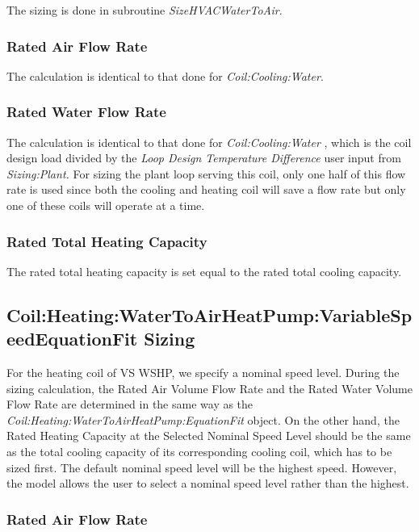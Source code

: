 The sizing is done in subroutine \emph{SizeHVACWaterToAir.}

\subsubsection{Rated Air Flow Rate}\label{rated-air-flow-rate-2}

The calculation is identical to that done for \emph{Coil:Cooling:Water}.

\subsubsection{Rated Water Flow Rate}\label{rated-water-flow-rate-2}

The calculation is identical to that done for \emph{Coil:Cooling:Water} , which is the coil design load divided by the \emph{Loop Design Temperature Difference} user input from \emph{Sizing:Plant.} For sizing the plant loop serving this coil, only one half of this flow rate is used since both the cooling and heating coil will save a flow rate but only one of these coils will operate at a time.

\subsubsection{Rated Total Heating Capacity}\label{rated-total-heating-capacity}

The rated total heating capacity is set equal to the rated total cooling capacity.

\subsection{Coil:Heating:WaterToAirHeatPump:VariableSpeedEquationFit Sizing}\label{coilheatingwatertoairheatpumpvariablespeedequationfit-sizing}

For the heating coil of VS WSHP, we specify a nominal speed level. During the sizing calculation, the Rated Air Volume Flow Rate and the Rated Water Volume Flow Rate are determined in the same way as the \emph{Coil:Heating:WaterToAirHeatPump:EquationFit} object. On the other hand, the Rated Heating Capacity at the Selected Nominal Speed Level should be the same as the total cooling capacity of its corresponding cooling coil, which has to be sized first. The default nominal speed level will be the highest speed. However, the model allows the user to select a nominal speed level rather than the highest.

\subsubsection{Rated Air Flow Rate}\label{rated-air-flow-rate-3}

